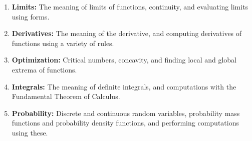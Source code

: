 \documentclass[10pt]{article}
\begin{document}
\begin{enumerate}
    \item \textbf{Limits:} The meaning of limits of functions, continuity, and evaluating limits using forms.

    \item \textbf{Derivatives:} The meaning of the derivative, and computing derivatives of functions using a variety of rules.

    \item \textbf{Optimization:} Critical numbers, concavity, and finding local and global extrema of functions.

    \item \textbf{Integrals:} The meaning of definite integrals, and computations with the Fundamental Theorem of Calculus.

    \item \textbf{Probability:} Discrete and continuous random variables, probability mass functions and probability density functions, and performing computations using these.
\end{enumerate}
\end{document}
